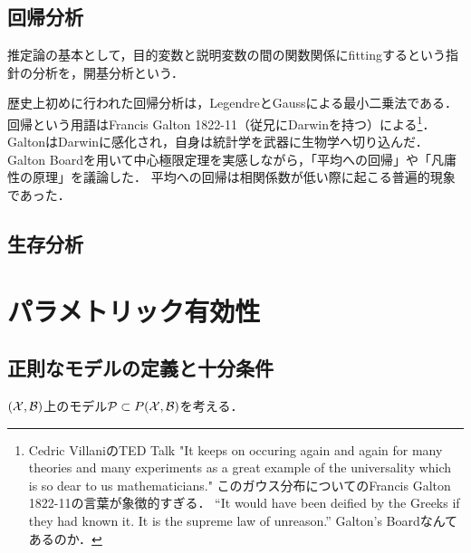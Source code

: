 \documentclass[uplatex,dvipdfmx]{jsreport}
\begin{document}
\section{回帰分析}

\begin{tcolorbox}[colframe=ForestGreen, colback=ForestGreen!10!white,breakable,colbacktitle=ForestGreen!40!white,coltitle=black,fonttitle=\bfseries\sffamily,
title=]
    推定論の基本として，目的変数と説明変数の間の関数関係にfittingするという指針の分析を，開基分析という．
\end{tcolorbox}

\begin{history}
    歴史上初めに行われた回帰分析は，LegendreとGaussによる最小二乗法である．
    回帰という用語はFrancis Galton 1822-11（従兄にDarwinを持つ）による\footnote{Cedric VillaniのTED Talk "It keeps on occuring again and again for many theories and many experiments as a great example of the universality which is so dear to us mathematicians."
    このガウス分布についてのFrancis Galton 1822-11の言葉が象徴的すぎる．
    “It would have been deified by the Greeks if they had known it. It is the supreme law of unreason.”
    Galton’s Boardなんてあるのか．}．
    GaltonはDarwinに感化され，自身は統計学を武器に生物学へ切り込んだ．Galton Boardを用いて中心極限定理を実感しながら，「平均への回帰」や「凡庸性の原理」を議論した．
    平均への回帰は相関係数が低い際に起こる普遍的現象であった．
\end{history}

\section{生存分析}

\chapter{パラメトリック有効性}

\section{正則なモデルの定義と十分条件}

\begin{notation}
    $(\mathcal{X},\mathcal{B})$上のモデル$\mathcal{P}\subset P(\mathcal{X},\mathcal{B})$を考える．
\end{notation}
\end{document}

